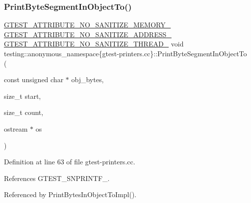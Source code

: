 \subsubsection{\texorpdfstring{Print\+Byte\+Segment\+In\+Object\+To()}{PrintByteSegmentInObjectTo()}}
{\footnotesize\ttfamily \hyperlink{gtest-port_8h_a2a83dd79037e53814a509cc3f5702650}{G\+T\+E\+S\+T\+\_\+\+A\+T\+T\+R\+I\+B\+U\+T\+E\+\_\+\+N\+O\+\_\+\+S\+A\+N\+I\+T\+I\+Z\+E\+\_\+\+M\+E\+M\+O\+R\+Y\+\_\+} \hyperlink{gtest-port_8h_af18b465f4ba6e36eea7a8d2d79521873}{G\+T\+E\+S\+T\+\_\+\+A\+T\+T\+R\+I\+B\+U\+T\+E\+\_\+\+N\+O\+\_\+\+S\+A\+N\+I\+T\+I\+Z\+E\+\_\+\+A\+D\+D\+R\+E\+S\+S\+\_\+} \hyperlink{gtest-port_8h_abf30a6b1b3a12ecb2cc1bc1a6f5f9646}{G\+T\+E\+S\+T\+\_\+\+A\+T\+T\+R\+I\+B\+U\+T\+E\+\_\+\+N\+O\+\_\+\+S\+A\+N\+I\+T\+I\+Z\+E\+\_\+\+T\+H\+R\+E\+A\+D\+\_\+} void testing\+::anonymous\+\_\+namespace\{gtest-\/printers.\+cc\}\+::Print\+Byte\+Segment\+In\+Object\+To (\begin{DoxyParamCaption}\item[{const unsigned char $\ast$}]{obj\+\_\+bytes,  }\item[{size\+\_\+t}]{start,  }\item[{size\+\_\+t}]{count,  }\item[{ostream $\ast$}]{os }\end{DoxyParamCaption})}



Definition at line 63 of file gtest-\/printers.\+cc.



References G\+T\+E\+S\+T\+\_\+\+S\+N\+P\+R\+I\+N\+T\+F\+\_\+.



Referenced by Print\+Bytes\+In\+Object\+To\+Impl().


